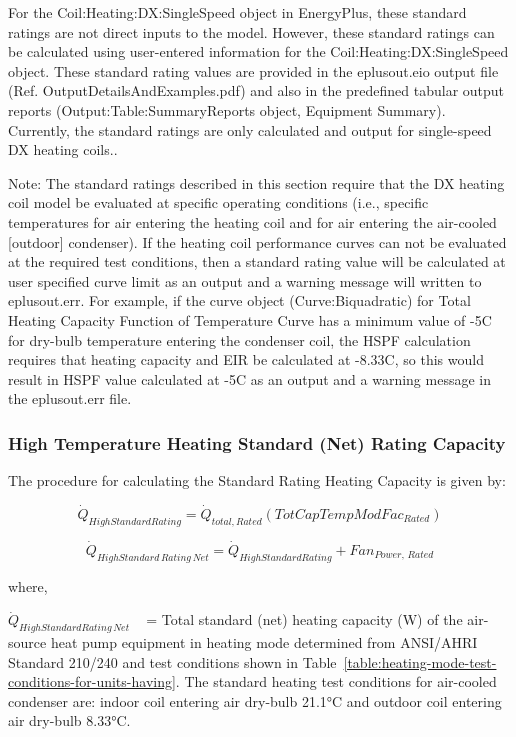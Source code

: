 For the Coil:Heating:DX:SingleSpeed object in EnergyPlus, these standard ratings are not direct inputs to the model. However, these standard ratings can be calculated using user-entered information for the Coil:Heating:DX:SingleSpeed object. These standard rating values are provided in the eplusout.eio output file (Ref. OutputDetailsAndExamples.pdf) and also in the predefined tabular output reports (Output:Table:SummaryReports object, Equipment Summary). Currently, the standard ratings are only calculated and output for single-speed DX heating coils..

Note: The standard ratings described in this section require that the DX heating coil model be evaluated at specific operating conditions (i.e., specific temperatures for air entering the heating coil and for air entering the air-cooled {[}outdoor{]} condenser). If the heating coil performance curves can not be evaluated at the required test conditions, then a standard rating value will be calculated at user specified curve limit as an output and a warning message will written to eplusout.err. For example, if the curve object (Curve:Biquadratic) for Total Heating Capacity Function of Temperature Curve has a minimum value of -5C for dry-bulb temperature entering the condenser coil, the HSPF calculation requires that heating capacity and EIR be calculated at -8.33C, so this would result in HSPF value calculated at -5C as an output and a warning message in the eplusout.err file.

\subsubsection{High Temperature Heating Standard (Net) Rating Capacity}\label{high-temperature-heating-standard-net-rating-capacity}

The procedure for calculating the Standard Rating Heating Capacity is given by:

\begin{equation}
{\dot Q_{HighStandardRating}} = {\dot Q_{total,Rated}}\left( {TotCapTempModFa{c_{Rated}}} \right)
\end{equation}

\begin{equation}
{\dot Q_{HighStandard\,Rating\,Net}} = {\dot Q_{HighStandardRating}} + Fa{n_{Power,\,Rated}}
\end{equation}

where,

\({\dot Q_{HighStandardRating\,Net}}\) ~ = Total standard (net) heating capacity (W) of the air-source heat pump equipment in heating mode determined from ANSI/AHRI Standard 210/240 and test conditions shown in Table~\ref{table:heating-mode-test-conditions-for-units-having}. The standard heating test conditions for air-cooled condenser are: indoor coil entering air dry-bulb 21.1°C and outdoor coil entering air dry-bulb 8.33°C.

